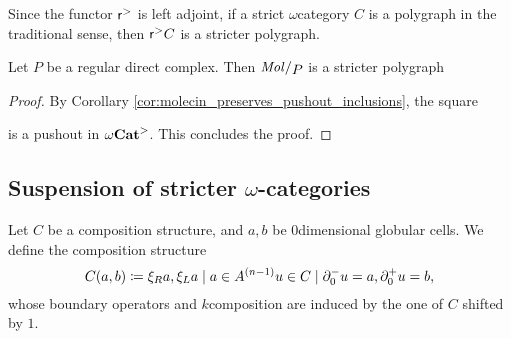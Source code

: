 \begin{rmk} \label{rmk:reflection_of_polygraph_is_stricter_polygraph}
    Since the functor \( \mathsf{r}^{>} \) is left adjoint, if a strict \( \omega \)\nbd category \( C \) is a polygraph in the traditional sense, then \( \mathsf{r}^{>} C \) is a stricter polygraph.
\end{rmk}

\begin{lem} \label{lem:stricter_regular_complex_are_stricter_polygraph}
    Let \( P \) be a regular direct complex.
    Then \( \molecin{P} \) is a stricter polygraph
\end{lem}
\begin{proof}
    By Corollary \ref{cor:molecin_preserves_pushout_inclusions}, the square
    \begin{center}
    \end{center}
    is a pushout in \( {\omega\mathbf{Cat}}^> \).
    This concludes the proof.
\end{proof}

\subsection{Suspension of stricter \texorpdfstring{$\omega$}{}-categories}

\begin{dfn} 
    Let \( C \) be a composition structure, and \( a, b \) be \( 0 \)\nbd dimensional globular cells.
    We define the composition structure
    \begin{equation*}
        C(a, b) \eqdef \set{u \in C \mid \bd{0}{-} u = a, \bd{0}{+} u = b},    
    \end{equation*}
    whose boundary operators and \( k \)\nbd composition are induced by the one of \( C \) shifted by \( 1 \).
\end{dfn}


